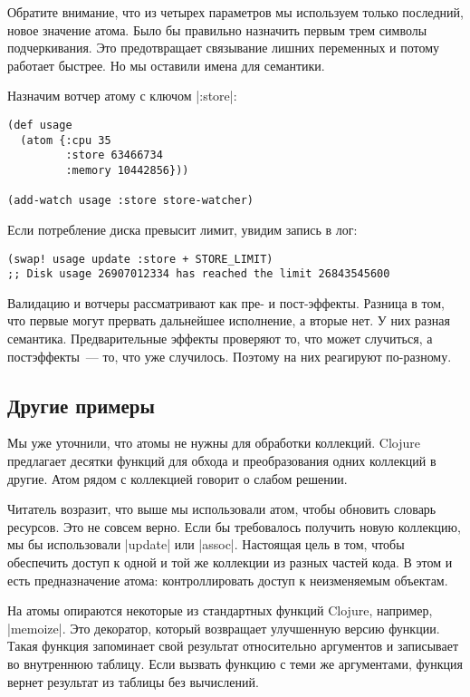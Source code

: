 Обратите внимание, что из четырех параметров мы используем только последний,
новое значение атома. Было бы правильно назначить первым трем символы
подчеркивания. Это предотвращает связывание лишних переменных и потому работает
быстрее. Но мы оставили имена для семантики.

Назначим вотчер атому с ключом \spverb|:store|:

\begin{verbatim}
(def usage
  (atom {:cpu 35
         :store 63466734
         :memory 10442856}))

(add-watch usage :store store-watcher)
\end{verbatim}

Если потребление диска превысит лимит, увидим запись в лог:

\begin{verbatim}
(swap! usage update :store + STORE_LIMIT)
;; Disk usage 26907012334 has reached the limit 26843545600
\end{verbatim}

Валидацию и вотчеры рассматривают как пре- и пост-эффекты. Разница в том, что
первые могут прервать дальнейшее исполнение, а вторые нет. У них разная
семантика. Предварительные эффекты проверяют то, что может случиться, а
постэффекты~--- то, что уже случилось. Поэтому на них реагируют по-разному.

\subsection{Другие примеры}

Мы уже уточнили, что атомы не нужны для обработки коллекций. Clojure предлагает
десятки функций для обхода и преобразования одних коллекций в другие. Атом рядом
с коллекцией говорит о слабом решении.

Читатель возразит, что выше мы использовали атом, чтобы обновить словарь
ресурсов. Это не совсем верно. Если бы требовалось получить новую коллекцию, мы
бы использовали \spverb|update| или \spverb|assoc|. Настоящая цель в том, чтобы обеспечить
доступ к одной и той же коллекции из разных частей кода. В этом и есть
предназначение атома: контроллировать доступ к неизменяемым объектам.

На атомы опираются некоторые из стандартных функций Clojure, например,
\spverb|memoize|. Это декоратор, который возвращает улучшенную версию функции. Такая
функция запоминает свой результат относительно аргументов и записывает во
внутреннюю таблицу. Если вызвать функцию с теми же аргументами, функция вернет
результат из таблицы без вычислений.


